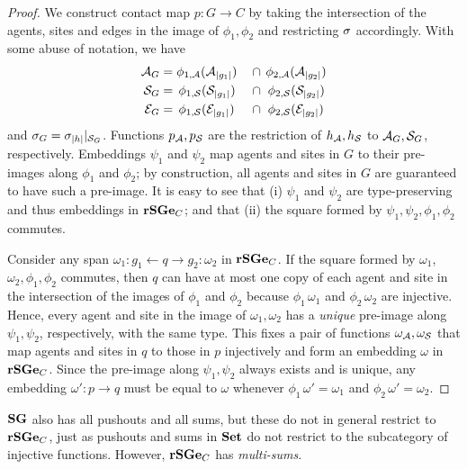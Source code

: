 \begin{proof}
  We construct contact map $p: G \to C$ by taking the intersection
  of the agents, sites and edges in the image of $\phi_1,\phi_2$
  and restricting $\sigma$ accordingly.
  With some abuse of notation, we have
  \begin{alignat*}{3}
    \mathcal{A}_G & {}= \phi_{1,\mathcal{A}}(\mathcal{A}_{\left|g_1\right|}) & {}\cap{} &
                  \,\phi_{2,\mathcal{A}}(\mathcal{A}_{\left|g_2\right|}) \\
    \mathcal{S}_G & {}= \,\phi_{1,\mathcal{S}}(\mathcal{S}_{\left|g_1\right|}) & {}\cap{} &
                 \,\,\phi_{2,\mathcal{S}}(\mathcal{S}_{\left|g_2\right|}) \\
    \mathcal{E}_G & {}= \,\phi_{1,\mathcal{S}}(\mathcal{E}_{\left|g_1\right|}) & {}\cap{} &
                 \,\,\phi_{2,\mathcal{S}}(\mathcal{E}_{\left|g_2\right|})
  \end{alignat*}
  and $\sigma_G = {\sigma_{\left|h\right|}}|_{\mathcal{S}_G}$.
  Functions $p_{\mathcal{A}},p_{\mathcal{S}}$ are the restriction of
  $h_{\mathcal{A}},h_{\mathcal{S}}$ to $\mathcal{A}_G,\mathcal{S}_G$, respectively.
  Embeddings $\psi_1$ and $\psi_2$ map agents and sites
  in $G$ to their pre-images along $\phi_1$ and $\phi_2$;
  by construction, all agents and sites in $G$
  are guaranteed to have such a pre-image.
  It is easy to see that
  (i) $\psi_1$ and $\psi_2$ are type-preserving
  and thus embeddings in $\mathbf{rSGe}_C$; and that
  (ii) the square formed by $\psi_1,\psi_2,\phi_1,\phi_2$ commutes.

  Consider any span $\omega_1: g_1 \gets q \to g_2 :\omega_2$ in $\mathbf{rSGe}_C$.
  If the square formed by $\omega_1$, $\omega_2,\phi_1,\phi_2$ commutes,
  then $q$ can have at most one copy of each agent and site
  in the intersection of the images of $\phi_1$ and $\phi_2$
  because $\phi_1\,\omega_1$ and $\phi_2\,\omega_2$ are injective.
  Hence, every agent and site in the image of $\omega_1,\omega_2$
  has a \emph{unique} pre-image along $\psi_1,\psi_2$, respectively,
  with the same type.
  This fixes a pair of functions $\omega_{\mathcal{A}},\omega_{\mathcal{S}}$
  that map agents and sites in $q$ to those in $p$ injectively
  and form an embedding $\omega$ in $\mathbf{rSGe}_C$.
  Since the pre-image along $\psi_1,\psi_2$ always exists and is unique,
  any embedding $\omega': p \to q$ must be equal to $\omega$
  whenever $\phi_1\,\omega' = \omega_1$ and
  $\phi_2\,\omega' = \omega_2$.
\end{proof}

$\mathbf{SG}$ also has all pushouts and all sums,
but these do not in general restrict to $\mathbf{rSGe}_C$,
just as pushouts and sums in $\mathbf{Set}$ do not restrict to
the subcategory of injective functions.
However, $\mathbf{rSGe}_C$ has \emph{multi-sums}.

